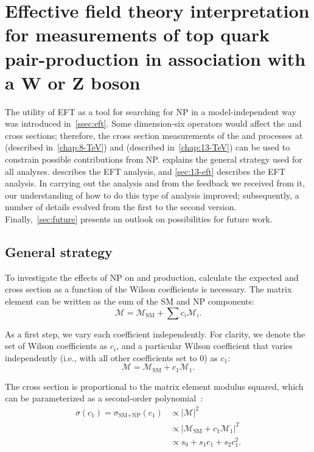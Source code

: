 \chapter{Effective field theory interpretation for measurements of top quark pair-production in association with a W or Z boson}
\label{chap:eft}

The utility of EFT as a tool for searching for NP in a model-independent way was
introduced in~\cref{ssec:eft}. Some dimension-six operators would affect the
\ttW and \ttZ cross sections; therefore, the cross section measurements of the
\ttW and \ttZ processes at \eightTeV (described in~\cref{chap:8-TeV}) and
\thirteenTeV (described in~\cref{chap:13-TeV}) can be used to constrain possible
contributions from NP.  explains the general strategy
used for all analyses.  describes the \eightTeV EFT analysis,
and \cref{sec:13-eft} describes the \thirteenTeV EFT analysis. In carrying out
the \eightTeV analysis and from the feedback we received from it, our
understanding of how to do this type of analysis improved; subsequently, a
number of details evolved from the first to the second version.
Finally,~\cref{sec:future} presents an outlook on possibilities for future work.

\section{General strategy}
\label{ssec:eft-strategy}
To investigate the effects of NP on \ttW and \ttZ production, calculate the
expected \ttW and \ttZ cross section as a function of the Wilson coefficients is
necessary. The matrix element can be written as the sum of the SM and NP
components:
\begin{equation}
  \mathcal{M} = \mathcal{M}_\text{SM} + \sum c_i\mathcal{M}_i.
\end{equation}

As a first step, we vary each coefficient independently. For clarity, we denote
the set of Wilson coefficients as $c_i$, and a particular Wilson coefficient
that varies independently (i.e., with all other coefficients set to 0) as $c_1$:
\begin{equation}
  \mathcal{M} = \mathcal{M}_\text{SM} + c_1\mathcal{M}_1.
\end{equation}

The cross section is proportional to the matrix element modulus squared, which
can be parameterized as a second-order polynomial~\cite{Rontsch2014}:
\begin{align}
  \sigma(c_1) = \sigma_\text{SM+NP}(c_1) &\propto |\mathcal{M}|^2\\
              &\propto | \mathcal{M}_\text{SM} + c_1\mathcal{M}_1|^2\\
              &\propto s_0 + s_1c_1 + s_2c_1^2.
  \label{eq:np-xsec}
\end{align}

